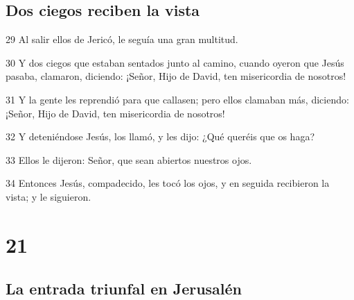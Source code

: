 \section*{Dos ciegos reciben la vista}

\par 29 Al salir ellos de Jericó, le seguía una gran multitud.
\par 30 Y dos ciegos que estaban sentados junto al camino, cuando oyeron que Jesús pasaba, clamaron, diciendo: ¡Señor, Hijo de David, ten misericordia de nosotros!
\par 31 Y la gente les reprendió para que callasen; pero ellos clamaban más, diciendo: ¡Señor, Hijo de David, ten misericordia de nosotros!
\par 32 Y deteniéndose Jesús, los llamó, y les dijo: ¿Qué queréis que os haga?
\par 33 Ellos le dijeron: Señor, que sean abiertos nuestros ojos.
\par 34 Entonces Jesús, compadecido, les tocó los ojos, y en seguida recibieron la vista; y le siguieron.

\chapter{21}

\section*{La entrada triunfal en Jerusalén}

